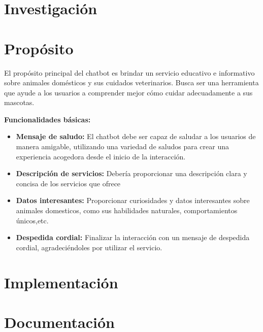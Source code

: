 \documentclass[a4paper,12pt]{article}
\begin{document}


\newpage

\section*{Investigación}

\section*{Propósito}
El propósito principal del chatbot es brindar un servicio educativo e informativo sobre animales domésticos y sus cuidados veterinarios. Busca ser una herramienta que ayude a los usuarios a comprender mejor cómo cuidar adecuadamente a sus mascotas.

\textbf{Funcionalidades básicas:}
\begin{itemize}
    \item \textbf{Mensaje de saludo:} El chatbot debe ser capaz de saludar a los usuarios de manera amigable, utilizando una variedad de saludos para crear una experiencia acogedora desde el inicio de la interacción.
    
    \item \textbf{Descripción de servicios:} Debería proporcionar una descripción clara y concisa de los servicios que ofrece 

    \item \textbf{Datos interesantes:} Proporcionar curiosidades y datos interesantes sobre animales domesticos, como sus habilidades naturales, comportamientos únicos,etc.

    \item \textbf{Despedida cordial:} Finalizar la interacción con un mensaje de despedida cordial, agradeciéndoles por utilizar el servicio.
\end{itemize}\section*{Implementación}

\section*{Documentación}

\newpage %
\thispagestyle{fancyref}
\printbibliography %
\end{document}

